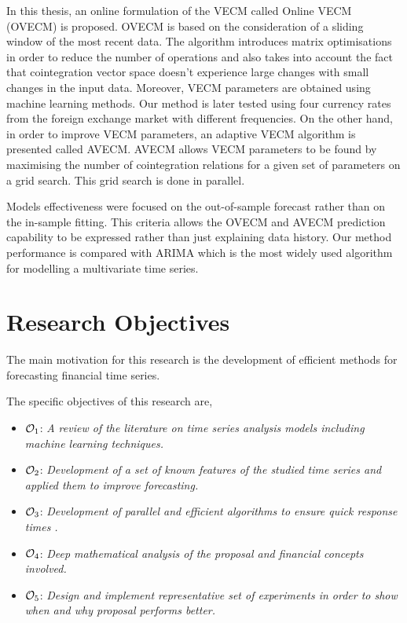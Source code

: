 In this thesis, an online formulation of the VECM called Online VECM
(OVECM) is proposed. OVECM is based on the consideration of a sliding window of the most recent data.
The algorithm introduces matrix optimisations in order to reduce the number of
operations and also takes into account the fact that cointegration vector space
doesn't experience large changes with small changes in the input data. Moreover, VECM parameters are obtained using machine learning methods. Our method is later tested using four
currency rates from the foreign exchange market with different frequencies.  
On the other hand, in order to improve VECM parameters, an adaptive VECM algorithm is presented called AVECM. AVECM allows VECM parameters to be found by maximising the number of cointegration relations for a given set of parameters on a grid search. This grid search is done in parallel.

Models effectiveness were focused on the out-of-sample forecast rather than on the in-sample fitting. This criteria allows the OVECM and AVECM prediction capability to be expressed rather than just explaining data history. Our method performance is compared with ARIMA which is the most widely used algorithm for modelling a multivariate time series.


\section{Research Objectives}
The main motivation for this research is the development of efficient methods for
forecasting financial time series.

The specific objectives of this research are,
\begin{itemize}
\item $\Large \mathcal{O}_1$: \emph{A review of the literature on time series
analysis models including machine learning techniques.}
\item $\Large \mathcal{O}_2$: \emph{Development of a set of known features of the
studied time series and applied them to improve forecasting.}
\item $\Large \mathcal{O}_3$: \emph{Development of parallel and efficient
algorithms to ensure quick response times .}
\item $\Large \mathcal{O}_4$: \emph{Deep mathematical analysis of the proposal
and financial concepts involved.}
\item $\Large \mathcal{O}_5$: \emph{Design and implement representative set of
experiments in order to show when and why proposal performs better.}
\end{itemize}


